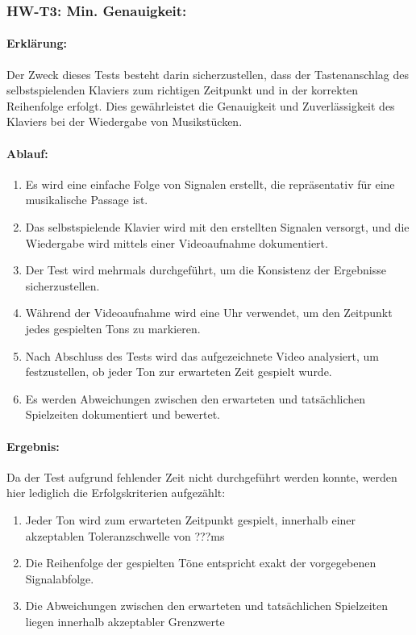 \subsubsection{HW-T3: Min. Genauigkeit:}

\paragraph{Erklärung:}
Der Zweck dieses Tests besteht darin sicherzustellen, dass der Tastenanschlag des selbstspielenden Klaviers zum richtigen
Zeitpunkt und in der korrekten Reihenfolge erfolgt. Dies gewährleistet die Genauigkeit und Zuverlässigkeit des Klaviers
bei der Wiedergabe von Musikstücken.

\paragraph{Ablauf:}
\begin{enumerate}
	\item Es wird eine einfache Folge von Signalen erstellt, die repräsentativ für eine musikalische Passage ist.
	\item Das selbstspielende Klavier wird mit den erstellten Signalen versorgt, und die Wiedergabe wird mittels einer Videoaufnahme dokumentiert.
	\item Der Test wird mehrmals durchgeführt, um die Konsistenz der Ergebnisse sicherzustellen.
	\item Während der Videoaufnahme wird eine Uhr verwendet, um den Zeitpunkt jedes gespielten Tons zu markieren.
	\item Nach Abschluss des Tests wird das aufgezeichnete Video analysiert, um festzustellen, ob jeder Ton zur erwarteten Zeit gespielt wurde.
	\item Es werden Abweichungen zwischen den erwarteten und tatsächlichen Spielzeiten dokumentiert und bewertet.
\end{enumerate}

\paragraph{Ergebnis:}
Da der Test aufgrund fehlender Zeit nicht durchgeführt werden konnte, werden hier lediglich die Erfolgskriterien aufgezählt:
\begin{enumerate}
	\item Jeder Ton wird zum erwarteten Zeitpunkt gespielt, innerhalb einer akzeptablen Toleranzschwelle von ???ms %
	\item Die Reihenfolge der gespielten Töne entspricht exakt der vorgegebenen Signalabfolge.
	\item Die Abweichungen zwischen den erwarteten und tatsächlichen Spielzeiten liegen innerhalb akzeptabler Grenzwerte %
\end{enumerate}


